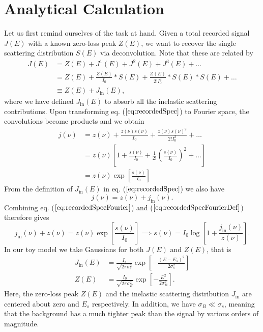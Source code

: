 \documentclass[a4paper,11pt]{article}
\begin{document}
\section{Analytical Calculation}
Let us first remind ourselves of the task at hand. Given a total recorded signal $J(E)$ with a known zero-loss peak $Z(E)$, we want to recover the single scattering distribution $S(E)$ via deconvolution. Note that these are related by
\begin{align}
\nonumber J(E) &= Z(E) + J^1(E) + J^2(E) + J^3(E) + \dots\\
\nonumber&= Z(E) + \frac{Z(E)}{I_0}*S(E) + \frac{Z(E)}{2!I_0^2}*S(E)*S(E) + \dots\\
&\equiv Z(E) + J_{\mathrm{in}}(E),
\label{eq:recordedSpec}
\end{align}
where we have defined $J_{\mathrm{in}}(E)$ to absorb all the inelastic scattering contributions. Upon transforming eq. ($\ref{eq:recordedSpec}$) to Fourier space, the convolutions become products and we obtain
\begin{align}
\nonumber j(\nu) &= z(\nu) + \frac{z(\nu)s(\nu)}{I_0} + \frac{z(\nu)s(\nu)^2}{2!I_0^2}+\dots\\
\nonumber&= z(\nu)\left[1+\frac{s(\nu)}{I_0}+\frac{1}{2!}\left(\frac{s(\nu)}{I_0}\right)^2+\dots\right]\\
&=z(\nu)\exp\left[\frac{s(\nu)}{I_0}\right]
\label{eq:recordedSpecFourier}
\end{align}
From the definition of $J_{\mathrm{in}}(E)$ in eq. ($\ref{eq:recordedSpec}$) we also have
\begin{equation}
j(\nu) = z(\nu) + j_{\mathrm{in}}(\nu).
\label{eq:recordedSpecFourierDef}
\end{equation}
Combining eq. ($\ref{eq:recordedSpecFourier}$) and ($\ref{eq:recordedSpecFourierDef}$) therefore gives
\begin{equation}
j_{\mathrm{in}}(\nu) + z(\nu) = z(\nu)\exp\left[\frac{s(\nu)}{I_0}\right] \implies s(\nu) = I_0\log\left[1+ \frac{j_{\mathrm{in}}(\nu)}{z(\nu)}\right].
\label{eq:snu}
\end{equation}
In our toy model we take Gaussians for both $J(E)$ and $Z(E)$, that is
\begin{align}
\label{eq:Jin}
J_{\mathrm{in}}(E) &= \frac{I_s}{\sqrt{2\pi\sigma_s^2}}\exp\left[-\frac{(E-E_s)^2}{2\sigma_s^2}\right]\\
Z(E) &= \frac{I_0}{\sqrt{2\pi\sigma_B^2}}\exp\left[-\frac{E^2}{2\sigma_B^2}\right].
\label{eq:ZLP}
\end{align}
Here, the zero-loss peak $Z(E)$ and the inelastic scattering distribution $J_{\mathrm{in}}$ are centered about zero and $E_s$ respectively. In addition, we have $\sigma_B \ll \sigma_s$, meaning that the background has a much tighter peak than the signal by various orders of magnitude. 
\end{document}
